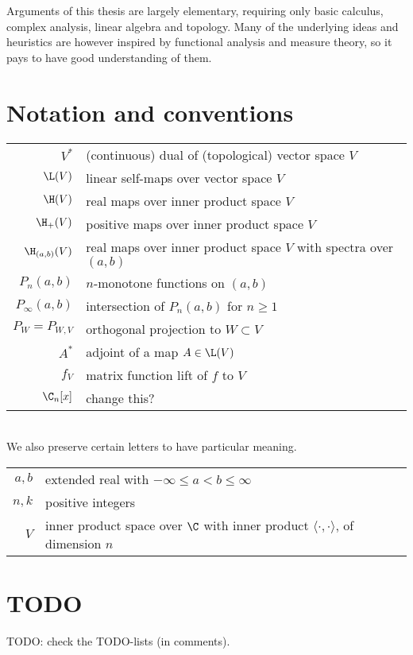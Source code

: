 Arguments of this thesis are largely elementary, requiring only basic calculus, complex analysis, linear algebra and topology. Many of the underlying ideas and heuristics are however inspired by functional analysis and measure theory, so it pays to have good understanding of them.

\section{Notation and conventions}

\begin{tabular}{r l}
	$V^{*}$ & (continuous) dual of (topological) vector space $V$ \\
	$\L(V)$ & linear self-maps over vector space $V$ \\
	$\H(V)$ & real maps over inner product space $V$ \\
	$\H_{+}(V)$ & positive maps over inner product space $V$ \\
	$\H_{(a, b)}(V)$ & real maps over inner product space $V$ with spectra over $(a, b)$ \\
	$P_{n}(a, b)$ & $n$-monotone functions on $(a, b)$ \\
	$P_{\infty}(a, b)$ & intersection of $P_{n}(a, b)$ for $n \geq 1$ \\
	$P_{W} = P_{W, V}$ & orthogonal projection to $W \subset V$ \\
	$A^{*}$ & adjoint of a map $A \in \L(V)$ \\
	$f_{V}$ & matrix function lift of $f$ to $V$ \\
	$\C_{n}[x]$ & change this? \\
\end{tabular}
\\
We also preserve certain letters to have particular meaning.
\\
\begin{tabular}{r l}
	$a, b$ & extended real with $-\infty \leq a < b \leq \infty$ \\ 
	$n, k$ & positive integers \\
	$V$ & inner product space over $\C$ with inner product $\langle \cdot, \cdot \rangle$, of dimension $n$ \\
\end{tabular}


\section{TODO}

TODO: check the TODO-lists (in comments).


























